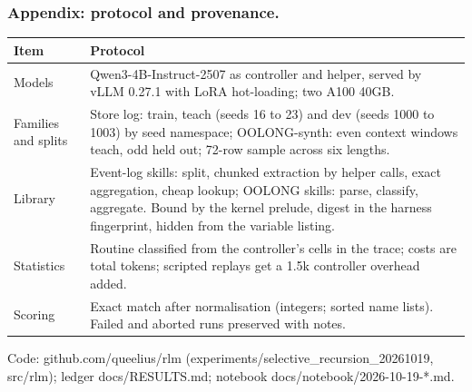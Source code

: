 \documentclass[aspectratio=169,11pt]{beamer}
\newcommand{\source}[1]{\vfill{\scriptsize\color{Gray}#1\par}}
\begin{document}
\appendix
\begin{frame}[t]
\frametitle{Appendix: protocol and provenance.}
\small
\begin{tabular}{@{}>{\raggedright\arraybackslash}p{}>{\raggedright\arraybackslash}p{}@{}}
\toprule
Item & Protocol \\
\midrule
Models & Qwen3-4B-Instruct-2507 as controller and helper, served by vLLM 0.27.1 with LoRA hot-loading; two A100 40GB. \\[1mm]
Families and splits & Store log: train, teach (seeds 16 to 23) and dev (seeds 1000 to 1003) by seed namespace; OOLONG-synth: even context windows teach, odd held out; 72-row sample across six lengths. \\[1mm]
Library & Event-log skills: split, chunked extraction by helper calls, exact aggregation, cheap lookup; OOLONG skills: parse, classify, aggregate. Bound by the kernel prelude, digest in the harness fingerprint, hidden from the variable listing. \\[1mm]
Statistics & Routine classified from the controller's cells in the trace; costs are total tokens; scripted replays get a 1.5k controller overhead added. \\[1mm]
Scoring & Exact match after normalisation (integers; sorted name lists). Failed and aborted runs preserved with notes. \\
\bottomrule
\end{tabular}
\source{Code: github.com/queelius/rlm (experiments/selective\_recursion\_20261019, src/rlm); ledger docs/RESULTS.md; notebook docs/notebook/2026-10-19-*.md.}
\end{frame}
\end{document}
